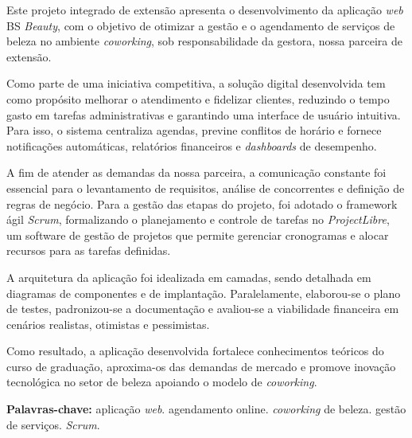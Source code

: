 	\begin{resumo}
	Este projeto integrado de extensão apresenta o desenvolvimento da aplicação \emph{web} BS \emph{Beauty}, com o objetivo de otimizar a gestão e o agendamento de serviços de beleza no ambiente \emph{coworking}, sob responsabilidade da gestora, nossa parceira de extensão.
	
	Como parte de uma iniciativa competitiva, a solução digital desenvolvida tem como propósito melhorar o atendimento e fidelizar clientes, reduzindo o tempo gasto em tarefas administrativas e garantindo uma interface de usuário intuitiva. Para isso, o sistema centraliza agendas, previne conflitos de horário e fornece notificações automáticas, relatórios financeiros e \emph{dashboards} de desempenho.
	
	A fim de atender as demandas da nossa parceira, a comunicação constante foi essencial para o levantamento de requisitos, análise de concorrentes e definição de regras de negócio. Para a gestão das etapas do projeto, foi adotado o framework ágil \emph{Scrum}, formalizando o planejamento e controle de tarefas no \emph{ProjectLibre}, um software de gestão de projetos que permite gerenciar cronogramas e alocar recursos para as tarefas definidas.
	
	A arquitetura da aplicação foi idealizada em camadas, sendo detalhada em diagramas de componentes e de implantação. Paralelamente, elaborou-se o plano de testes, padronizou-se a documentação e avaliou-se a viabilidade financeira em cenários realistas, otimistas e pessimistas.
	
	Como resultado, a aplicação desenvolvida fortalece conhecimentos teóricos do curso de graduação, aproxima-os das demandas de mercado e promove inovação tecnológica no setor de beleza apoiando o modelo de \emph{coworking}.

\textbf{Palavras-chave:} aplicação \emph{web}. agendamento online. \emph{coworking} de beleza. gestão de serviços. \emph{Scrum}.

	\end{resumo}